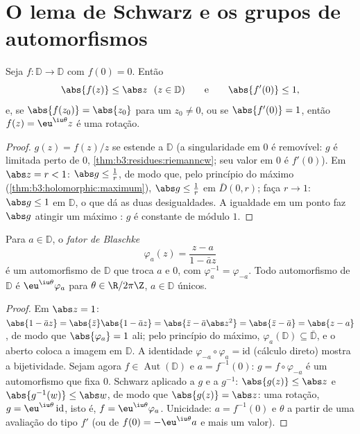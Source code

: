 \section{O lema de Schwarz e os grupos de automorfismos}

\begin{theorem}\label{thm:b3:conformal:schwarz}
Seja $f \colon \mathbb D \to \mathbb D$  com $f(0) = 0$. Então
\[
\abs{f(z)} \leq \abs z \ \ (z \in \mathbb D)
\qquad\text{e}\qquad \abs{f'(0)} \leq 1 ,
\]
e, se $\abs{f(z_0)} = \abs{z_0}$ para um $z_0 \neq 0$, ou se $\abs{f'(0)} = 1$, então $f(z) = \eu^{\iu\theta}z$ é uma rotação.
\end{theorem}

\begin{proof}
$g(z) = f(z)/z$ se estende  a $\mathbb D$ (a singularidade em $0$ é
removível: $g$ é limitada perto de $0$, \cref{thm:b3:residues:riemanncw}; seu valor
em $0$ é $f'(0)$). Em $\abs z = r < 1$: $\abs g \leq \frac1r$, de modo que, pelo princípio do
máximo (\cref{thm:b3:holomorphic:maximum}), $\abs g \leq \frac1r$ em $\bar D(0,r)$; faça $r \to 1$: $\abs
g \leq 1$ em $\mathbb D$, o que
dá as duas desigualdades. A igualdade em um ponto  faz
$\abs g$ atingir um máximo : $g$ é constante de módulo
$1$.
\end{proof}

\begin{theorem}
\label{thm:b3:conformal:autdisc}
Para $a \in \mathbb D$, o \emph{fator de Blaschke}
\[
\varphi_a(z) = \frac{z - a}{1 - \bar a z}
\]
é um automorfismo de $\mathbb D$ que troca $a$ e $0$, com $\varphi_a^{-1} = \varphi_{-a}$. Todo
automorfismo de $\mathbb D$ é $\eu^{\iu\theta}\varphi_a$ para $\theta
\in \R/2\pi\Z$, $a \in \mathbb D$ únicos.
\end{theorem}

\begin{proof}
Em $\abs z = 1$: $\abs{1 - \bar az} = \abs{\bar z}\abs{1 -
\bar az} = \abs{\bar z - \bar a\abs z^2} = \abs{\bar z - \bar
a} = \abs{z - a}$, de modo que $\abs{\varphi_a} = 1$ ali; pelo princípio do máximo, $\varphi_a(\mathbb D) \subseteq \bar{\mathbb
D}$, e
o  aberto coloca a imagem em $\mathbb D$. A identidade  $\varphi_{-a}\circ\varphi_a = \mathrm{id}$
(cálculo direto) mostra a bijetividade. Sejam agora $f \in
\operatorname{Aut}(\mathbb D)$ e $a = f^{-1}(0)$: $g =
f\circ\varphi_{-a}$ é
um automorfismo que fixa $0$. Schwarz aplicado a $g$ e a
$g^{-1}$: $\abs{g(z)} \leq \abs z$ e $\abs{g^{-1}(w)} \leq \abs w$, de modo que $\abs{g(z)} = \abs z$: uma rotação, $g = \eu^{\iu\theta}\,\mathrm{id}$, isto é,
$f =
\eu^{\iu\theta}\varphi_a$. Unicidade: $a = f^{-1}(0)$ e $\theta$ a partir de uma avaliação do tipo
$f'$ (ou de $f(0) =
-\eu^{\iu\theta}a$ e mais um valor).
\end{proof}

